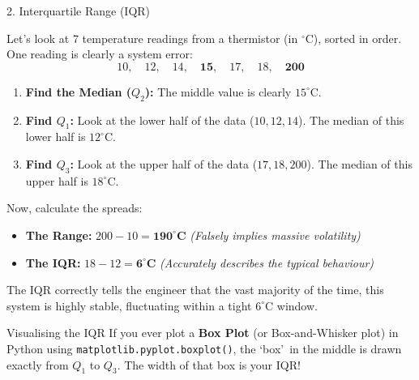 \begin{frame}{2. Interquartile Range (IQR)}
{        \begin{example}
            Let's look at 7 temperature readings from a thermistor (in $^\circ\text{C}$), sorted in order. One reading is clearly a system error:
            \[ 10, \quad 12, \quad 14, \quad \mathbf{15}, \quad 17, \quad 18, \quad \mathbf{200} \]
            
            \begin{enumerate}
                \item \textbf{Find the Median ($Q_2$):} The middle value is clearly $15^\circ\text{C}$.
                \item \textbf{Find $Q_1$:} Look at the lower half of the data ($10, 12, 14$). The median of this lower half is $12^\circ\text{C}$.
                \item \textbf{Find $Q_3$:} Look at the upper half of the data ($17, 18, 200$). The median of this upper half is $18^\circ\text{C}$.
            \end{enumerate}
            
            Now, calculate the spreads:
            \begin{itemize}
                \item \textbf{The Range:} $200 - 10 = \mathbf{190^\circ\text{C}}$ \textit{(Falsely implies massive volatility)}
                \item \textbf{The IQR:} $18 - 12 = \mathbf{6^\circ\text{C}}$ \textit{(Accurately describes the typical behaviour)}
            \end{itemize}
            
            The IQR correctly tells the engineer that the vast majority of the time, this system is highly stable, fluctuating within a tight $6^\circ\text{C}$ window.
        \end{example}

        \begin{block}{Visualising the IQR}
            If you ever plot a \textbf{Box Plot} (or Box-and-Whisker plot) in Python using \texttt{matplotlib.pyplot.boxplot()}, the \lq box\rq\ in the middle is drawn exactly from $Q_1$ to $Q_3$. The width of that box is your IQR!
        \end{block}
    }
\end{frame}


